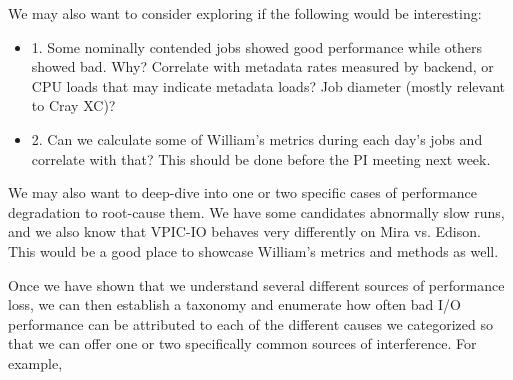 \documentclass[conference,10pt,compsocconf]{IEEEtran}
\begin{document}
We may also want to consider exploring if the following would be interesting:

\begin{itemize}
\item 1. Some nominally contended jobs showed good performance while others showed bad.  Why?  Correlate with metadata rates measured by backend, or CPU loads that may indicate metadata loads?  Job diameter (mostly relevant to Cray XC)?
\item 2. Can we calculate some of William's metrics during each day's jobs and correlate with that?  This should be done before the PI meeting next week.
\end{itemize}

We may also want to deep-dive into one or two specific cases of performance
degradation to root-cause them.  We have some candidates abnormally slow runs,
and we also know that VPIC-IO behaves very differently on Mira vs. Edison.
This would be a good place to showcase William's metrics and methods as well.

Once we have shown that we understand several different sources of performance
loss, we can then establish a taxonomy and enumerate how often bad I/O
performance can be attributed to each of the different causes we categorized so
that we can offer one or two specifically common sources of interference.  For
example,
\end{document}
